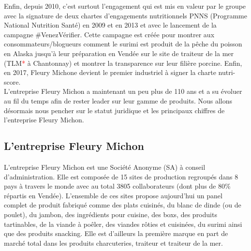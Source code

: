 \documentclass[a4paper,12pt]{extarticle}
\newcommand{\alinea}{\hspace*{0.4cm}}
\begin{document}
\alinea
    Enfin, depuis 2010, c’est surtout l’engagement qui est mis en valeur par le groupe avec la signature de deux chartes d’engagements nutritionnels PNNS (Programme National Nutrition Santé) en 2009 et en 2013 et avec le lancement de la campagne \#VenezVérifier. Cette campagne est créée pour montrer aux consommateurs/blogueurs comment le surimi est produit de la pêche du poisson en Alaska jusqu'à leur préparation en Vendée sur le site de traiteur de la mer (TLM\textcolor{red}{*} à Chantonnay) et montrer la transparence sur leur filière porcine. Enfin, en 2017, Fleury Michone devient le premier industriel à signer la charte nutri-score.\\
L’entreprise Fleury Michon a maintenant un peu plus de 110 ans et a su évoluer au fil du temps afin de rester leader sur leur gamme de produits. Nous allons désormais nous pencher sur le statut juridique et les principaux chiffres de l’entreprise Fleury Michon.

	\subsection{L’entreprise Fleury Michon}
		\paragraph{}
	
	L’entreprise Fleury Michon est une Société Anonyme (SA) à conseil d'administration. Elle est composée de 15 sites de production regroupés dans 8 pays à travers le monde avec au total 3805 collaborateurs (dont plus de 80\% répartis en Vendée). L’ensemble de ces sites propose aujourd’hui un panel complet de produit fabriqué comme des plats cuisinés, du blanc de dinde (ou de poulet), du jambon, des ingrédients pour cuisine, des boxs, des produits tartinables, de la viande à poêler, des viandes rôties et cuisinées, du surimi ainsi que des produits snacking. Elle est d’ailleurs la première marque en part de marché total dans les produits charcuteries, traiteur et traiteur de la mer.\\
\end{document}
